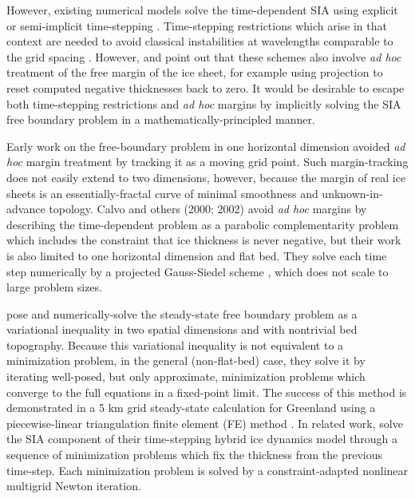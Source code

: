 \documentclass[twocolumn,a4paper]{igs}
\begin{document}
However, existing numerical models solve the time-dependent SIA using explicit or semi-implicit time-stepping  \citep{HindmarshPayne1996,Huybrechtsetal1996,Bueleretal2005,EgholmNielsen2010,JaroschSchoofAnslow2013}.  Time-stepping restrictions which arise in that context are needed to avoid classical instabilities at wavelengths comparable to the grid spacing \citep{MortonMayers2005}.  However, \cite{Bueleretal2005} and \cite{JaroschSchoofAnslow2013} point out that these schemes also involve \emph{ad hoc} treatment of the free margin of the ice sheet, for example using projection to reset computed negative thicknesses back to zero.  It would be desirable to escape both time-stepping restrictions and \emph{ad hoc} margins by implicitly solving the SIA free boundary problem in a mathematically-principled manner.

Early work on the free-boundary problem in one horizontal dimension \citep{Hindmarshetal1987} avoided \emph{ad hoc} margin treatment by tracking it as a moving grid point.  Such margin-tracking does not easily extend to two dimensions, however, because the margin of real ice sheets is an essentially-fractal curve of minimal smoothness and unknown-in-advance topology.  Calvo and others (2000; 2002)\nocite{CalvoDuranyVazquez2000,Calvoetal2002} avoid \emph{ad hoc} margins by describing the time-dependent problem as a parabolic complementarity problem which includes the constraint that ice thickness is never negative, but their work is also limited to one horizontal dimension and flat bed.  They solve each time step numerically by a projected Gauss-Siedel scheme \citep{Ciarlet2002}, which does not scale to large problem sizes.

\cite{JouvetBueler2012} pose and numerically-solve the steady-state free boundary problem as a variational inequality \citep{KinderlehrerStampacchia1980} in two spatial dimensions and with nontrivial bed topography.  Because this variational inequality is not equivalent to a minimization problem, in the general (non-flat-bed) case, they solve it by iterating well-posed, but only approximate, minimization problems which converge to the full equations in a fixed-point limit.  The success of this method is demonstrated in a 5 km grid steady-state calculation for Greenland using a piecewise-linear triangulation finite element (FE) method \citep{Elmanetal2005}.  In related work, \cite{JouvetGraeser2013} solve the SIA component of their time-stepping hybrid ice dynamics model \citep{Winkelmannetal2011} through a sequence of minimization problems which fix the thickness from the previous time-step.  Each minimization problem is solved by a constraint-adapted nonlinear multigrid Newton iteration.
\end{document}
